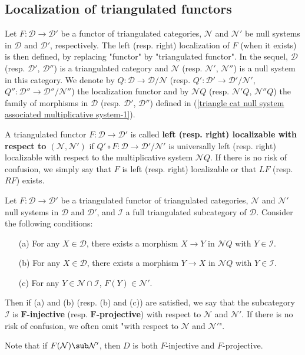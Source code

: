 \subsection{Localization of triangulated functors}
Let $F:\mathcal{D}\to\mathcal{D}'$ be a functor of triangulated categories, $\mathcal{N}$ and $\mathcal{N}'$ be null systems in $\mathcal{D}$ and $\mathcal{D}'$, respectively. The left (resp. right) localization of $F$ (when it exists) is then defined, by replacing "functor" by "triangulated functor". In the sequel, $\mathcal{D}$ (resp. $\mathcal{D}'$, $\mathcal{D}''$) is a triangulated category and $\mathcal{N}$ (resp. $\mathcal{N}'$, $\mathcal{N}''$) is a null system in this category. We denote by $Q:\mathcal{D}\to\mathcal{D}/\mathcal{N}$ (resp. $Q':\mathcal{D}'\to\mathcal{D}'/\mathcal{N}'$, $Q'':\mathcal{D}''\to\mathcal{D}''/\mathcal{N}''$) the localization functor and by $\mathcal{N}Q$ (resp. $\mathcal{N}'Q$, $\mathcal{N}''Q$) the family of morphisms in $\mathcal{D}$ (resp. $\mathcal{D}'$, $\mathcal{D}''$) defined in (\ref{triangle cat null system associated multiplicative system-1}).

\begin{definition}
A triangulated functor $F:\mathcal{D}\to\mathcal{D}'$ is called \textbf{left (resp. right) localizable with respect to $(\mathcal{N},\mathcal{N}')$} if $Q'\circ F:\mathcal{D}\to\mathcal{D}'/\mathcal{N}'$ is universally left (resp. right) localizable with respect to the multiplicative system $\mathcal{N}Q$. If there is no risk of confusion, we simply say that $F$ is left (resp. right) localizable or that $LF$ (resp. $RF$) exists.
\end{definition}

\begin{definition}
Let $F:\mathcal{D}\to\mathcal{D}'$ be a triangulated functor of triangulated categories, $\mathcal{N}$ and $\mathcal{N}'$ null systems in $\mathcal{D}$ and $\mathcal{D}'$, and $\mathcal{I}$ a full triangulated subcategory of $\mathcal{D}$. Consider the following conditions:
\begin{enumerate}
    \item[(a)] For any $X\in\mathcal{D}$, there exists a morphism $X\to Y$ in $\mathcal{N}Q$ with $Y\in\mathcal{I}$.
    \item[(b)] For any $X\in\mathcal{D}$, there exists a morphism $Y\to X$ in $\mathcal{N}Q$ with $Y\in\mathcal{I}$.
    \item[(c)] For any $Y\in\mathcal{N}\cap\mathcal{I}$, $F(Y)\in\mathcal{N}'$. 
\end{enumerate}
Then if (a) and (b) (resp. (b) and (c)) are satisfied, we say that the subcategory $\mathcal{I}$ is \textbf{$\bm{F}$-injective} (resp. \textbf{$\bm{F}$-projective}) with respect to $\mathcal{N}$ and $\mathcal{N}'$. If there is no risk of confusion, we often omit "with respect to $\mathcal{N}$ and $\mathcal{N}'$".
\end{definition}
Note that if $F(\mathcal{N})\sub\mathcal{N}'$, then $D$ is both $F$-injective and $F$-projective.

